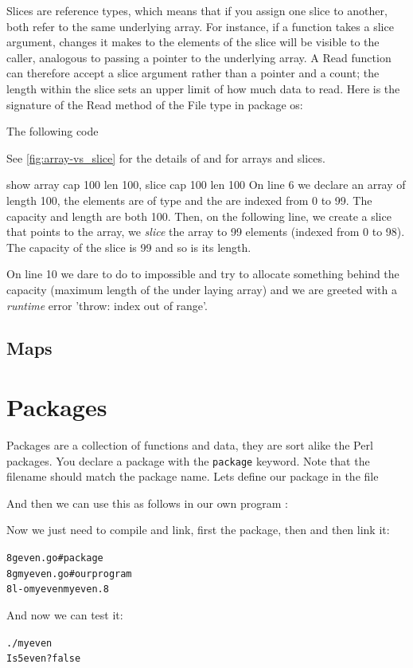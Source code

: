 Slices are reference types, which means that if you assign one slice to
another, both refer to the same underlying array. For instance, if a
function takes a slice argument, changes it makes to the elements of the
slice will be visible to the caller, analogous to passing a pointer to
the underlying array. A Read function can therefore accept a slice
argument rather than a pointer and a count; the length within the slice
sets an upper limit of how much data to read. Here is the signature of
the Read method of the File type in package os:

The following code 


See \ref{fig:array-vs_slice} for the details of  and
 for arrays and slices.

show 
array cap 100 len 100, slice cap 100 len 100
On line 6 we declare an array of length 100, the elements are of
type  and the are indexed from 0 to 99. The capacity
and length are both 100. Then, on the following line, we create
a slice that points to the array, we \emph{slice} the array to
99 elements (indexed from 0 to 98). The capacity of the slice
is 99 and so is its length. 

On line 10 we dare to do to impossible and try to allocate something
behind the capacity (maximum length of the under laying array) and
we are greeted with a \emph{runtime} error 'throw: index out of range'.

\subsection{Maps}
\label{sec:maps}

\section{Packages}
\label{sec:packages}
Packages are a collection of functions and data, they are sort alike the
Perl packages\cite{perl-packages}. You declare a package with the
\lstinline{package} keyword. Note that the filename should
match the package name. Lets define our package  in the file


And then we can use this as follows in our own program :


Now we just need to compile and link, first the package, then  and
then link it:
\begin{alltt}
\pr 8g even.go			# package
\pr 8g myeven.go		# our program
\pr 8l -o myeven myeven.8
\end{alltt}
And now we can test it:
\begin{alltt}
\pr ./myeven
Is 5 even? false
\end{alltt}

